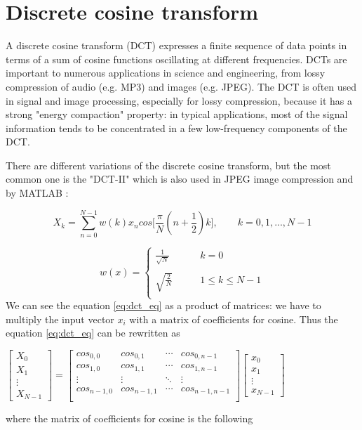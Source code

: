 \chapter{Discrete cosine transform} \label{DCT}
A discrete cosine transform (DCT) expresses a finite sequence of data points in terms of a sum of cosine functions oscillating at different frequencies. DCTs are important to numerous applications in science and engineering, from lossy compression of audio (e.g. MP3) and images (e.g. JPEG).
The DCT is often used in signal and image processing, especially for lossy compression, because it has a strong "energy compaction" property: in typical applications, most of the signal information tends to be concentrated in a few low-frequency components of the DCT.

There are different variations of the discrete cosine transform, but the most common one is the "DCT-II" which is also used in JPEG image compression and by MATLAB \circledR:



  \begin{equation} \label{eq:dct_eq}	
   X_{k}= \sum_{n=0}^{N-1} w(k)x_{n}cos\bigg[\frac{\pi}{N} (n+\frac{1}{2})k\bigg], \qquad k=0,1,...,N-1
 \end{equation}
 

    \[
    w(x)=\left\{
    \begin{array}{ll}
    \frac{1}{\sqrt{N}} & \qquad k=0\\
    &\\
    \sqrt{\frac{2}{N}} & \qquad 1\leqslant k \leqslant N-1\\
    \end{array}
    \right.
    \]
\bigskip
We can see the equation \ref{eq:dct_eq} as a product of matrices: we have to multiply the input vector $ x_{i} $  with a matrix of coefficients for cosine.
Thus the equation \ref{eq:dct_eq} can be rewritten as 

\begin{center}
\bigskip	
$\begin{bmatrix}X_{0}\\ X_{1} \\ \vdots \\X_{N-1} \end{bmatrix} = 
\begin{bmatrix}
	cos_{0,0} & cos_{0,1} & \cdots & cos_{0,n-1} \\
	cos_{1,0} & cos_{1,1} & \cdots & cos_{1,n-1} \\
	\vdots  & \vdots  & \ddots & \vdots  \\
	cos_{n-1,0} & cos_{n-1,1} & \cdots & cos_{n-1,n-1}  \\
\end{bmatrix} \begin{bmatrix}x_{0}\\ x_{1} \\ \vdots \\x_{N-1} \end{bmatrix}$

\end{center}
\bigskip
where the matrix of coefficients for cosine is the following

